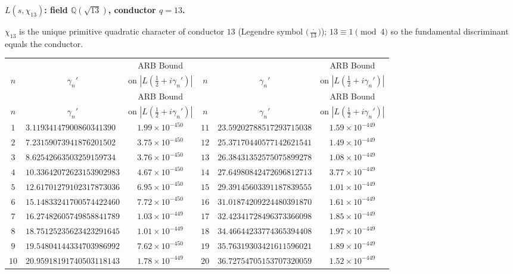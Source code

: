 \documentclass[12pt,reqno]{amsart}
\theoremstyle{plain}
\theoremstyle{definition}
\theoremstyle{remark}
\newcommand{\Q}{\mathbb{Q}}
\begin{document}
\medskip\noindent\textbf{$L(s,\chi_{13})$: field $\Q(\sqrt{13})$, conductor $q=13$.}\par\smallskip
\label{app:chi13-zeros}

$\chi_{13}$ is the unique primitive quadratic character of conductor $13$ (Legendre symbol
$\bigl(\tfrac{\cdot}{13}\bigr)$); $13 \equiv 1 \pmod{4}$ so the fundamental discriminant
equals the conductor.

\renewcommand{\arraystretch}{1.05}\footnotesize
\begin{longtable}{clc|clc}
\toprule
 & & \multicolumn{1}{c}{ARB Bound} &
 & & \multicolumn{1}{c}{ARB Bound} \\
$n$ & \multicolumn{1}{c}{$\gamma_n'$} & \multicolumn{1}{c}{on $|L(\tfrac{1}{2}+i\gamma_n')|$} &
$n$ & \multicolumn{1}{c}{$\gamma_n'$} & \multicolumn{1}{c}{on $|L(\tfrac{1}{2}+i\gamma_n')|$} \\
\midrule
\endfirsthead
\toprule
 & & \multicolumn{1}{c}{ARB Bound} &
 & & \multicolumn{1}{c}{ARB Bound} \\
$n$ & \multicolumn{1}{c}{$\gamma_n'$} & \multicolumn{1}{c}{on $|L(\tfrac{1}{2}+i\gamma_n')|$} &
$n$ & \multicolumn{1}{c}{$\gamma_n'$} & \multicolumn{1}{c}{on $|L(\tfrac{1}{2}+i\gamma_n')|$} \\
\midrule
\endhead
\bottomrule
\endlastfoot
$1$ & $3.11934147900860341390$ & $1.99 \times 10^{-450}$ & $11$ & $23.59202788517293715038$ & $1.59 \times 10^{-449}$ \\
$2$ & $7.23159073941876201502$ & $3.75 \times 10^{-450}$ & $12$ & $25.37170440577142621541$ & $1.49 \times 10^{-449}$ \\
$3$ & $8.62542663503259159734$ & $3.76 \times 10^{-450}$ & $13$ & $26.38431352575075899278$ & $1.08 \times 10^{-449}$ \\
$4$ & $10.33642072623153902983$ & $4.67 \times 10^{-450}$ & $14$ & $27.64980842472696812713$ & $3.77 \times 10^{-449}$ \\
$5$ & $12.61701279102317873036$ & $6.95 \times 10^{-450}$ & $15$ & $29.39145603391187839555$ & $1.01 \times 10^{-449}$ \\
$6$ & $15.14833241700574422460$ & $7.72 \times 10^{-450}$ & $16$ & $31.01874209224480391870$ & $1.61 \times 10^{-449}$ \\
$7$ & $16.27482605749858841789$ & $1.03 \times 10^{-449}$ & $17$ & $32.42341728496373366098$ & $1.85 \times 10^{-449}$ \\
$8$ & $18.75125235623423291645$ & $1.01 \times 10^{-449}$ & $18$ & $34.46644233774365394408$ & $1.97 \times 10^{-449}$ \\
$9$ & $19.54804144334703986992$ & $7.62 \times 10^{-450}$ & $19$ & $35.76319303421611596021$ & $1.89 \times 10^{-449}$ \\
$10$ & $20.95918191740503118143$ & $1.78 \times 10^{-449}$ & $20$ & $36.72754705153707320059$ & $1.52 \times 10^{-449}$ \\

\end{longtable}
\normalsize
\end{document}
